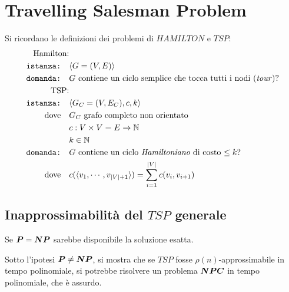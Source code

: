 \section{Travelling Salesman Problem}
Si ricordano le definizioni dei problemi di $HAMILTON$ e $TSP$:
\begin{align*}
    \text{Hamilton:} & \quad \\
    \texttt{istanza:} \quad & \langle G=(V,E) \rangle \\
    \texttt{domanda:} \quad & G \text{ contiene un ciclo semplice che tocca tutti i nodi (\emph{tour})?} \\
    \text{TSP:} & \quad \\
    \texttt{istanza:} \quad & \langle G_C=(V,E_C), c, k \rangle \\
    \text{dove} \quad & G_C \text{ grafo completo non orientato} \\
    & c : V \times V = E \to \mathbb{N} \\
    & k \in \mathbb{N} \\
    \texttt{domanda:} \quad & G \text{ contiene un ciclo \emph{Hamiltoniano} di costo $\leq k$?} \\
    \text{dove} \quad &  c(\langle v_1, \cdots, v_{|V|+1} \rangle) = \sum_{i=1}^{|V|} c(v_i, v_{i+1} )  \\
\end{align*}

\subsection{Inapprossimabilità del $TSP$ generale}
Se $\bm{P} = \bm{NP}$ sarebbe disponibile la soluzione esatta.

Sotto l'ipotesi $\bm{P} \ne \bm{NP}$, si mostra che se $TSP$ fosse $\rho(n)$-approssimabile in tempo polinomiale, si potrebbe risolvere un problema $\bm{NPC}$ in tempo polinomiale, che è assurdo.


